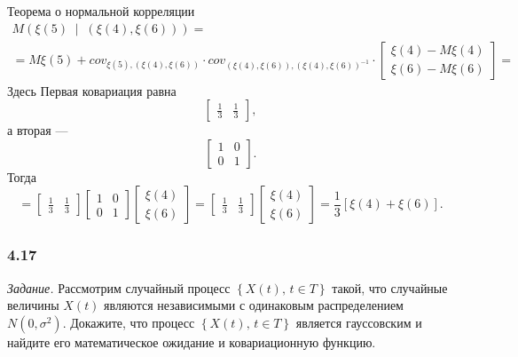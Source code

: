 \begin{enumerate}[label=\alph*)]
  Теорема о нормальной корреляции
  \begin{gather*}
    M \left(
      \xi \left( 5 \right) \; \middle| \; \left( \xi \left( 4 \right), \xi \left( 6 \right) \right)
    \right) = \\
    = M \xi \left( 5 \right) +
    cov_{ \xi \left(5 \right), \left( \xi \left( 4 \right), \xi \left( 6 \right) \right) } \cdot
    cov_{\left(\xi\left(4\right),\xi\left(6\right)\right),\left(\xi\left(4\right),\xi\left(6\right)\right)^{-1}} \cdot
    \begin{bmatrix}
      \xi \left( 4 \right) - M \xi \left( 4 \right) \\
      \xi \left( 6 \right) - M \xi \left( 6 \right)
    \end{bmatrix} =
  \end{gather*}
  Здесь
  Первая ковариация равна
  $$ \begin{bmatrix}
    \frac{1}{3} & \frac{1}{3}
  \end{bmatrix},$$
  а вторая ---
  $$ \begin{bmatrix}
    1 & 0 \\
    0 & 1
  \end{bmatrix}.$$
  Тогда
  $$= \begin{bmatrix}
    \frac{1}{3} & \frac{1}{3}
  \end{bmatrix}
  \begin{bmatrix}
    1 & 0 \\
    0 & 1
  \end{bmatrix}
  \begin{bmatrix}
    \xi \left( 4 \right) \\
    \xi \left( 6 \right)
  \end{bmatrix} =
  \begin{bmatrix}
    \frac{1}{3} & \frac{1}{3}
  \end{bmatrix}
  \begin{bmatrix}
    \xi \left( 4 \right) \\
    \xi \left( 6 \right)
  \end{bmatrix} =
  \frac{1}{3} \left[ \xi \left( 4 \right) + \xi \left( 6 \right) \right].$$
\end{enumerate}

\subsubsection*{4.17}

\textit{Задание.}
Рассмотрим случайный процесс $ \left\{ X \left( t \right), \, t \in T \right\} $ такой,
что случайные величины $X \left( t \right) $ являются независимыми с одинаковым распределением
$N \left( 0, \sigma^2 \right) $.
Докажите, что процесс $ \left\{ X \left( t \right), \, t \in T \right\} $
является гауссовским и найдите его математическое ожидание и ковариационную функцию.

